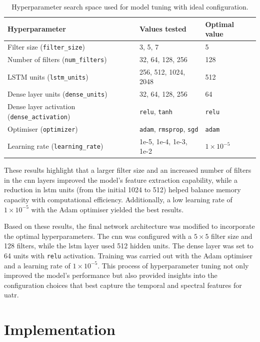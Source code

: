 \begin{table}[htbp] 
\centering 
    \begin{tabular}{lll} 
    \toprule 
    \textbf{Hyperparameter} & \textbf{Values tested} & \textbf{Optimal value} \\ 
    \midrule 
    Filter size (\texttt{filter\_size}) & 3, 5, 7 & 5 \\ 
    Number of filters (\texttt{num\_filters}) & 32, 64, 128, 256 & 128 \\ 
    LSTM units (\texttt{lstm\_units}) & 256, 512, 1024, 2048 & 512 \\ 
    Dense layer units (\texttt{dense\_units}) & 32, 64, 128, 256 & 64 \\ 
    Dense layer activation (\texttt{dense\_activation}) & \texttt{relu}, \texttt{tanh} & \texttt{relu} \\ 
    Optimiser (\texttt{optimizer}) & \texttt{adam}, \texttt{rmsprop}, \texttt{sgd} & \texttt{adam} \\ 
    Learning rate (\texttt{learning\_rate}) & 1e-5, 1e-4, 1e-3, 1e-2 & $1 \times 10^{-5}$ \\ 
    \bottomrule 
    \end{tabular} 
\caption{Hyperparameter search space used for model tuning with ideal configuration.} 
\label{tab:hyperparameter-search-space} 
\end{table}

These results highlight that a larger filter size and an increased number of filters in the \acrshort{cnn} layers improved the model's feature extraction capability, while a reduction in \acrshort{lstm} units (from the initial 1024 to 512) helped balance memory capacity with computational efficiency. Additionally, a low learning rate of $1 \times 10^{-5}$ with the Adam optimiser yielded the best results.

Based on these results, the final network architecture was modified to incorporate the optimal hyperparameters. The \acrshort{cnn} was configured with a $5\times5$ filter size and 128 filters, while the \acrshort{lstm} layer used 512 hidden units. The dense layer was set to 64 units with \texttt{relu} activation. Training was carried out with the Adam optimiser and a learning rate of $1 \times 10^{-5}$. This process of hyperparameter tuning not only improved the model's performance but also provided insights into the configuration choices that best capture the temporal and spectral features for \acrlong{uatr}.

\section{Implementation}

